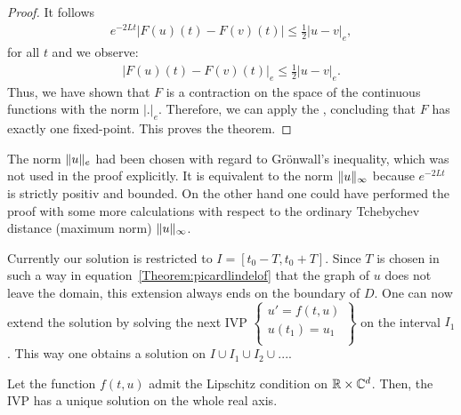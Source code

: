 \begin{proof}
  It follows   
  \begin{gather*}
    e^{-2 L t}|F(u)(t) - F(v)(t)| \le \frac12 |u-v|_e,
  \end{gather*}
  for all $t$ and we observe:
  \begin{gather*}
    |F(u)(t) - F(v)(t)|_e \le \frac12 |u-v|_e.
  \end{gather*}
  Thus, we have shown that $F$ is a contraction on the space of the
  continuous functions with the norm $|.|_e$.  Therefore, we can apply
  the , concluding that $F$ has
  exactly one fixed-point. This proves the theorem.
\end{proof}

\begin{remark}
  The norm $\lVert u\rVert_e$ had been chosen with regard to Grönwall's
  inequality, which was not used in the proof explicitly.  It is
  equivalent to the norm $\lVert u\rVert_\infty$ because $e^{-2 L t}$ is strictly
  positiv and bounded. On the other hand one could have performed the
  proof with some more calculations with respect to the ordinary
  Tchebychev distance (maximum norm) $\lVert u\rVert_\infty$.
\end{remark}

\begin{remark}
  Currently our solution is restricted to $I = [t_0 - T, t_0 + T]$.
  Since $T$ is chosen in such a way in
  equation~\ref{Theorem:picardlindelof} that the graph of $u$ does not
  leave the domain, this extension always ends on the boundary of
  $D$. One can now extend the solution by solving the next IVP
  $\left\{\begin{array}{l}
            u' = f(t,u)\\
            u(t_1) = u_1\\
  \end{array}\right\}$
	on the interval $I_1$. This way one obtains a solution on
 $I \cup I_1 \cup I_2 \cup ...$.
\end{remark}

\begin{corollary}
  Let the function $f(t,u)$ admit the Lipschitz condition on $\mathbb R\times
  \mathbb C^d$. Then, the IVP has a unique solution on the whole real axis.
\end{corollary}

